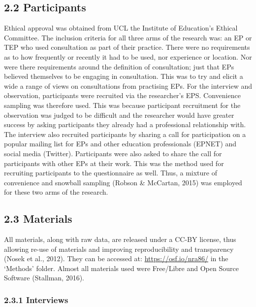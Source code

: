 \documentclass[
  english,
  man]{apa}
\begin{document}
\hypertarget{participants}{%
\subsection{2.2 Participants}\label{participants}}

Ethical approval was obtained from UCL the Institute of Education's Ethical Committee. The inclusion criteria for all three arms of the research was: an EP or TEP who used consultation as part of their practice. There were no requirements as to how frequently or recently it had to be used, nor experience or location. Nor were there requirements around the definition of consultation; just that EPs believed themselves to be engaging in consultation. This was to try and elicit a wide a range of views on consultations from practising EPs. For the interview and observation, participants were recruited via the researcher's EPS. Convenience sampling was therefore used. This was because participant recruitment for the observation was judged to be difficult and the researcher would have greater success by asking participants they already had a professional relationship with. The interview also recruited participants by sharing a call for participation on a popular mailing list for EPs and other education professionals (EPNET) and social media (Twitter). Participants were also asked to share the call for participants with other EPs at their work. This was the method used for recruiting participants to the questionnaire as well. Thus, a mixture of convenience and snowball sampling (Robson \& McCartan, 2015) was employed for these two arms of the research.

\hypertarget{materials}{%
\subsection{2.3 Materials}\label{materials}}

All materials, along with raw data, are released under a CC-BY license, thus allowing re-use of materials and improving reproducibility and transparency (Nosek et al., 2012). They can be accessed at: \url{https://osf.io/nra86/} in the `Methods' folder. Almost all materials used were Free/Libre and Open Source Software (Stallman, 2016).

\hypertarget{interviews}{%
\subsubsection{2.3.1 Interviews}\label{interviews}}
\end{document}
